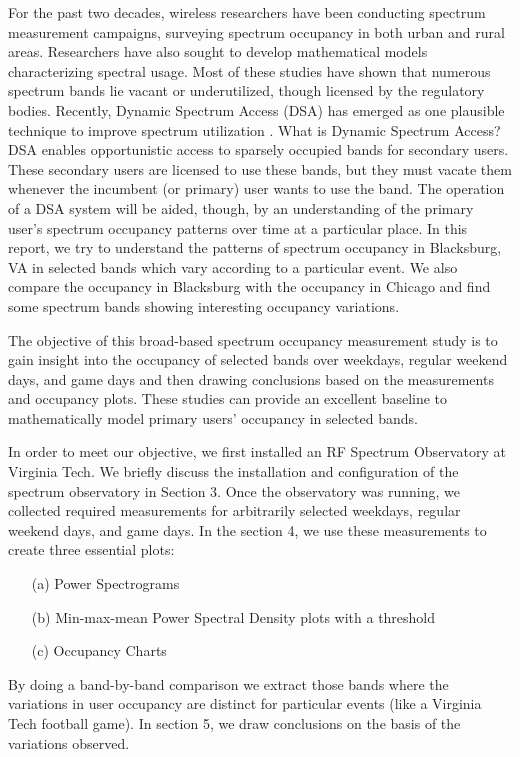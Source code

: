 \documentclass[12pt,sts]{report}
\begin{document}
For the past two decades, wireless researchers have been conducting spectrum measurement campaigns, surveying spectrum occupancy in both urban and rural areas. Researchers have also sought to develop mathematical models characterizing spectral usage. Most of these studies have shown that numerous spectrum bands lie vacant or underutilized, though licensed by the regulatory bodies. Recently, Dynamic Spectrum Access (DSA) has emerged as one plausible technique to improve spectrum utilization \cite{Akyildiz06nextgeneration/dynamic}. What is Dynamic Spectrum Access? DSA enables opportunistic access to sparsely occupied bands for secondary users. These secondary users are licensed to use these bands, but they must vacate them whenever the incumbent (or primary) user wants to use the band. The operation of a DSA system will be aided, though, by an understanding of the primary user's spectrum occupancy patterns over time at a particular place. In this report, we try to understand the patterns of spectrum occupancy in Blacksburg, VA in selected bands which vary according to a particular event. We also compare the occupancy in Blacksburg with the occupancy in Chicago and find some spectrum bands showing interesting occupancy variations.

	The objective of this broad-based spectrum occupancy measurement study is to gain insight into the occupancy of selected bands over weekdays, regular weekend days, and game days and then drawing conclusions based on the measurements and occupancy plots. These studies can provide an excellent baseline to mathematically model primary users' occupancy in selected bands.
	
	In order to meet our objective, we first installed an RF Spectrum Observatory at Virginia Tech. We briefly discuss the installation and configuration of the spectrum observatory in Section 3. Once the observatory was running, we collected required measurements for arbitrarily selected weekdays, regular weekend days, and game days. In the section 4, we use these measurements to create three essential plots:
	\begin{enumerate}
		\item[(a)] Power Spectrograms %
		\item[(b)] Min-max-mean Power Spectral Density plots with a threshold %
		\item[(c)] Occupancy Charts %
	\end{enumerate}
	By doing a band-by-band comparison we extract those bands where the variations in user occupancy are distinct for particular events (like a Virginia Tech football game). In section 5, we draw conclusions on the basis of the variations observed.
\end{document}
